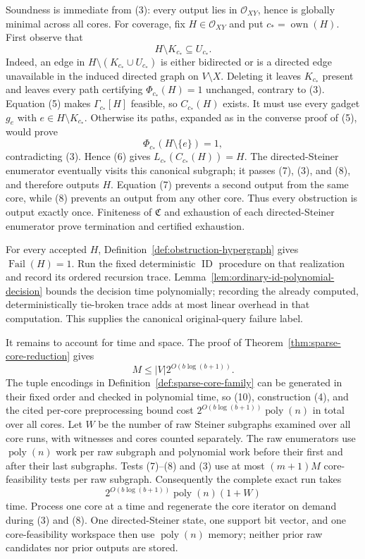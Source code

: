 Soundness is immediate from (3): every output lies in \(\mathcal O_{XY}\), hence is globally minimal across all cores.  For coverage, fix \(H\in\mathcal O_{XY}\) and put \(c_* =\operatorname{own}(H)\).  First observe that
\[
 H\setminus K_{c_*}\subseteq U_{c_*}.
 \tag{9}
\]
Indeed, an edge in \(H\setminus(K_{c_*}\cup U_{c_*})\) is either bidirected or is a directed edge unavailable in the induced directed graph on \(V\setminus X\).  Deleting it leaves \(K_{c_*}\) present and leaves every path certifying \(\Phi_{c_*}(H)=1\) unchanged, contrary to (3).  Equation (5) makes \(\Gamma_{c_*}[H]\) feasible, so \(C_{c_*}(H)\) exists.  It must use every gadget \(g_e\) with \(e\in H\setminus K_{c_*}\).  Otherwise its paths, expanded as in the converse proof of (5), would prove
\[
 \Phi_{c_*}(H\setminus\{e\})=1,
\]
contradicting (3).  Hence (6) gives \(L_{c_*}(C_{c_*}(H))=H\).  The directed-Steiner enumerator eventually visits this canonical subgraph; it passes (7), (3), and (8), and therefore outputs \(H\).  Equation (7) prevents a second output from the same core, while (8) prevents an output from any other core.  Thus every obstruction is output exactly once.  Finiteness of \(\mathfrak C\) and exhaustion of each directed-Steiner enumerator prove termination and certified exhaustion.

For every accepted \(H\), Definition~\ref{def:obstruction-hypergraph} gives \(\operatorname{Fail}(H)=1\).  Run the fixed deterministic \(\operatorname{ID}\) procedure on that realization and record its ordered recursion trace.  Lemma~\ref{lem:ordinary-id-polynomial-decision} bounds the decision time polynomially; recording the already computed, deterministically tie-broken trace adds at most linear overhead in that computation.  This supplies the canonical original-query failure label.

It remains to account for time and space.  The proof of Theorem~\ref{thm:sparse-core-reduction} gives
\[
 M\le |V|2^{O(b\log(b+1))}.
 \tag{10}
\]
The tuple encodings in Definition~\ref{def:sparse-core-family} can be generated in their fixed order and checked in polynomial time, so (10), construction (4), and the cited per-core preprocessing bound cost \(2^{O(b\log(b+1))}\operatorname{poly}(n)\) in total over all cores.  Let \(W\) be the number of raw Steiner subgraphs examined over all core runs, with witnesses and cores counted separately.  The raw enumerators use \(\operatorname{poly}(n)\) work per raw subgraph and polynomial work before their first and after their last subgraphs.  Tests (7)--(8) and (3) use at most \((m+1)M\) core-feasibility tests per raw subgraph.  Consequently the complete exact run takes
\[
 2^{O(b\log(b+1))}\operatorname{poly}(n)(1+W)
\tag{11}
\]
time.  Process one core at a time and regenerate the core iterator on demand during (3) and (8).  One directed-Steiner state, one support bit vector, and one core-feasibility workspace then use \(\operatorname{poly}(n)\) memory; neither prior raw candidates nor prior outputs are stored.

